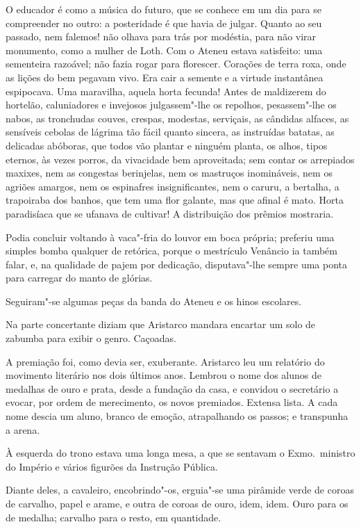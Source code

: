 O educador é como a
música do futuro, que se conhece em um dia para se compreender no
outro: a posteridade é que havia de julgar. Quanto ao seu passado, nem
falemos! não olhava para trás por modéstia, para não virar monumento,
como a mulher de Loth. Com o Ateneu estava satisfeito: uma sementeira
razoável; não fazia rogar para florescer. Corações de terra roxa, onde
as lições do bem pegavam vivo. Era cair a semente e a virtude
instantânea espipocava. Uma maravilha, aquela horta fecunda! Antes de
maldizerem do hortelão, caluniadores e invejosos julgassem"-lhe os
repolhos, pesassem"-lhe os nabos, as tronchudas couves, crespas,
modestas, serviçais, as cândidas alfaces, as sensíveis cebolas de
lágrima tão fácil quanto sincera, as instruídas batatas, as delicadas
abóboras, que todos vão plantar e ninguém planta, os alhos, tipos
eternos, às vezes porros, da vivacidade bem aproveitada; sem contar os
arrepiados maxixes, nem as congestas berinjelas, nem os mastruços
inomináveis, nem os agriões amargos, nem os espinafres insignificantes,
nem o caruru, a bertalha, a trapoiraba dos banhos, que tem uma flor
galante, mas que afinal é mato. Horta paradisíaca que se ufanava de
cultivar! A distribuição dos prêmios mostraria. 


Podia concluir voltando
à vaca"-fria do louvor em boca própria; preferiu uma simples bomba
qualquer de retórica, porque o mestrículo Venâncio ia também falar, e,
na qualidade de pajem por dedicação, disputava"-lhe sempre uma ponta
para carregar do manto de glórias. 

Seguiram"-se algumas peças da banda do Ateneu e os hinos escolares.

Na parte concertante diziam que Aristarco mandara encartar um solo de
zabumba para exibir o genro. Caçoadas.

A premiação foi, como devia ser,
exuberante. Aristarco leu um relatório do movimento literário nos dois
últimos anos. Lembrou o nome dos alunos de medalhas de ouro e prata,
desde a fundação da casa, e convidou o secretário a evocar, por ordem
de merecimento, os novos premiados. Extensa lista. A cada nome descia
um aluno, branco de emoção, atrapalhando os passos; e transpunha a
arena. 

À esquerda do trono estava uma longa mesa, a que se sentavam o
Exmo.~ministro do Império e vários figurões da Instrução Pública.

Diante deles, a cavaleiro, encobrindo"-os, erguia"-se uma pirâmide
verde de coroas de carvalho, papel e arame, e outra de coroas de ouro,
idem, idem. Ouro para os de medalha; carvalho para o resto, em
quantidade. 


